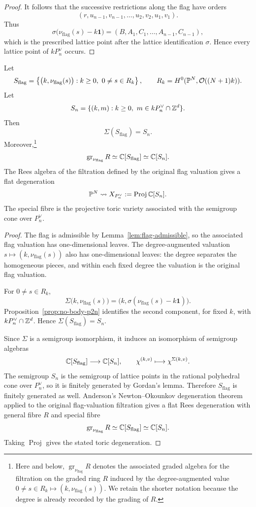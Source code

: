 \begin{proof}
It follows that the successive restrictions along the flag have orders
\[
(r,u_{n-1},v_{n-1},\ldots,u_2,v_2,u_1,v_1).
\]
Thus
\[
\sigma\bigl(\nu_{\mathrm{flag}}(s)-k\mathbf 1\bigr)
=
(B,A_1,C_1,\ldots,A_{n-1},C_{n-1}),
\]
which is the prescribed lattice point after the lattice identification \(\sigma\). Hence every lattice point of \(kP_n^\vee\) occurs.
\end{proof}

\begin{thm}\label{thm:no-toric-degeneration}
Let
\[
S_{\mathrm{flag}}
=
\left\{
\bigl(k,\nu_{\mathrm{flag}}(s)\bigr):
k\ge0,\ 0\ne s\in R_k
\right\},
\qquad
R_k=H^0(\mathbb{P}^N,\mathcal O((N+1)k)).
\]
Let
\[
S_n=\{(k,m):k\ge0,\ m\in kP_n^\vee\cap\mathbb{Z}^d\}.
\]
Then
\[
\Sigma(S_{\mathrm{flag}})=S_n.
\]
Moreover,\footnote{Here and below, \(\operatorname{gr}_{\nu_{\mathrm{flag}}}R\) denotes the associated graded algebra for the filtration on the graded ring \(R\) induced by the degree-augmented value \(0\ne s\in R_k\mapsto(k,\nu_{\mathrm{flag}}(s))\). We retain the shorter notation because the degree is already recorded by the grading of \(R\).}
\[
\operatorname{gr}_{\nu_{\mathrm{flag}}}R
\simeq \mathbb{C}[S_{\mathrm{flag}}]\simeq \mathbb{C}[S_n].
\]
The Rees algebra of the filtration defined by the original flag valuation gives a flat degeneration
\[
\mathbb{P}^N\rightsquigarrow X_{P_n^\vee}:=\operatorname{Proj}\mathbb{C}[S_n].
\]
The special fibre is the projective toric variety associated with the semigroup cone over \(P_n^\vee\).
\end{thm}

\begin{proof}
The flag is admissible by Lemma~\ref{lem:flag-admissible}, so the associated flag valuation has one-dimensional leaves. The degree-augmented valuation \(s\mapsto(k,\nu_{\mathrm{flag}}(s))\) also has one-dimensional leaves: the degree separates the homogeneous pieces, and within each fixed degree the valuation is the original flag valuation.

For \(0\ne s\in R_k\),
\[
\Sigma\bigl(k,\nu_{\mathrm{flag}}(s)\bigr)
=
\bigl(k,\sigma(\nu_{\mathrm{flag}}(s)-k\mathbf 1)\bigr).
\]
Proposition~\ref{prop:no-body-p2n} identifies the second component, for fixed \(k\), with \(kP_n^\vee\cap\mathbb{Z}^d\). Hence \(\Sigma(S_{\mathrm{flag}})=S_n\).

Since \(\Sigma\) is a semigroup isomorphism, it induces an isomorphism of semigroup algebras
\[
\mathbb{C}[S_{\mathrm{flag}}]\longrightarrow \mathbb{C}[S_n],
\qquad
\chi^{(k,v)}\longmapsto \chi^{\Sigma(k,v)}.
\]
The semigroup \(S_n\) is the semigroup of lattice points in the rational polyhedral cone over \(P_n^\vee\), so it is finitely generated by Gordan's lemma. Therefore \(S_{\mathrm{flag}}\) is finitely generated as well. Anderson's Newton--Okounkov degeneration theorem applied to the original flag-valuation filtration gives a flat Rees degeneration with general fibre \(R\) and special fibre
\[
\operatorname{gr}_{\nu_{\mathrm{flag}}}R\simeq\mathbb{C}[S_{\mathrm{flag}}]\simeq\mathbb{C}[S_n].
\]
Taking \(\operatorname{Proj}\) gives the stated toric degeneration.
\end{proof}

